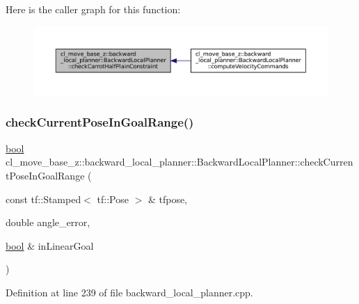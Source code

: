 Here is the caller graph for this function\+:
\nopagebreak
\begin{figure}[H]
\begin{center}
\leavevmode
\includegraphics[width=350pt]{classcl__move__base__z_1_1backward__local__planner_1_1BackwardLocalPlanner_a22938e354a4ec489101295ed7f2539f6_icgraph}
\end{center}
\end{figure}
\mbox{\label{classcl__move__base__z_1_1backward__local__planner_1_1BackwardLocalPlanner_a8b84e3961a79317a9c978ec054e4a112}} 
\subsubsection{\texorpdfstring{check\+Current\+Pose\+In\+Goal\+Range()}{checkCurrentPoseInGoalRange()}}
{\footnotesize\ttfamily \hyperlink{classbool}{bool} cl\+\_\+move\+\_\+base\+\_\+z\+::backward\+\_\+local\+\_\+planner\+::\+Backward\+Local\+Planner\+::check\+Current\+Pose\+In\+Goal\+Range (\begin{DoxyParamCaption}\item[{const tf\+::\+Stamped$<$ tf\+::\+Pose $>$ \&}]{tfpose,  }\item[{double}]{angle\+\_\+error,  }\item[{\hyperlink{classbool}{bool} \&}]{in\+Linear\+Goal }\end{DoxyParamCaption})\hspace{0.3cm}{\ttfamily [private]}}



Definition at line 239 of file backward\+\_\+local\+\_\+planner.\+cpp.



